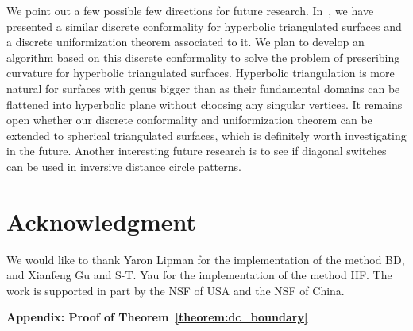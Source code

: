\documentclass[11pt]{article}
\begin{document}
We point out a few possible few directions for future research. In~\cite{gglsw}, we 
have presented a similar discrete conformality for hyperbolic triangulated surfaces and 
a discrete uniformization theorem associated to it. We
plan to develop an algorithm based on this discrete conformality to solve the problem of 
prescribing curvature for hyperbolic triangulated surfaces. Hyperbolic triangulation is 
more natural for surfaces with genus bigger than  as their fundamental domains can be 
flattened into hyperbolic plane without choosing any singular vertices.  
It remains open whether our discrete conformality and uniformization theorem can be extended
to spherical triangulated surfaces, which is definitely worth investigating in the future.  
Another interesting future research is to see if diagonal switches can be used in 
inversive distance circle patterns. 


\section{Acknowledgment} 
We would like to thank Yaron Lipman for the implementation of the method BD, 
and Xianfeng Gu and S-T. Yau for the implementation of the method HF. 
The work is supported in part by the NSF of USA and the NSF of China.




\vspace{8mm}
\noindent\textbf{Appendix: Proof of Theorem~\ref{theorem:dc_boundary}}
\end{document}
